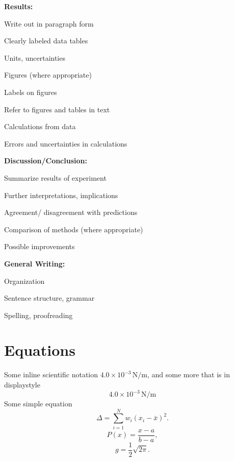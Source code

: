 \documentclass[
    10pt,aps,prl,
    amsfonts,
    amssymb,
    amsmath,
    runinaddress,
    secnum,
    showkeys,
    superscriptaddress,
    twocolumn,
]{revtex4}
\begin{document}
    \textbf{Results:}
    \begin{itemize*}[label=\square]
        \item Write out in paragraph form
        \item Clearly labeled data tables
        \item Units, uncertainties
        \item Figures (where appropriate)
        \item Labels on figures
        \item Refer to figures and tables in text
        \item Calculations from data
        \item Errors and uncertainties in calculations
    \end{itemize*}

    \textbf{Discussion/Conclusion:}
    \begin{itemize*}[label=\square]
        \item Summarize results of experiment
        \item Further interpretations, implications
        \item Agreement/ disagreement with predictions
        \item Comparison of methods (where appropriate)
        \item Possible improvements
    \end{itemize*}

    \textbf{General Writing:}
    \begin{itemize*}[label=\square]
        \item Organization
        \item Sentence structure, grammar
        \item Spelling, proofreading
    \end{itemize*}



\section{Equations}
Some inline scientific notation $4.0\times 10^{-3}\,\mathrm{N/m}$,
    and some more that is in displaystyle
\begin{equation}
    4.0\times 10^{-3}\,\mathrm{N/m}
\end{equation}
Some simple equation
\begin{equation}
    \Delta =\sum_{i=1}^N w_i (x_i - \bar{x})^2.
\end{equation}
\begin{equation}
    P(x) = \frac{x - a}{b - a}, \nonumber
\end{equation}
\begin{equation}
    g = \frac{1}{2} \sqrt{2\pi}. \nonumber
\end{equation}
\end{document}
